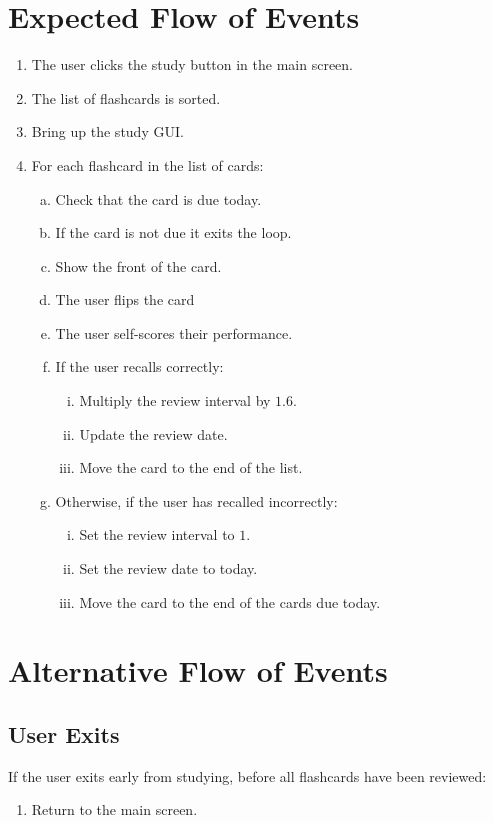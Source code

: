 \documentclass{scrreprt}
\begin{document}
\section{Expected Flow of Events}
\begin{enumerate}[1.]
    \item The user clicks the study button in the main screen.
    \item The list of flashcards is sorted.
    \item Bring up the study GUI.
    \item For each flashcard in the list of cards:
    \begin{enumerate}[a.]
        \item Check that the card is due today.
        \item If the card is not due it exits the loop.
        \item Show the front of the card.
        \item The user flips the card
        \item The user self-scores their performance.
        \item If the user recalls correctly:
        \begin{enumerate}[i)]
            \item Multiply the review interval by $1.6$.
            \item Update the review date.
            \item Move the card to the end of the list.
        \end{enumerate}
        \item Otherwise, if the user has recalled incorrectly:
        \begin{enumerate}[i)]
            \item Set the review interval to $1$.
            \item Set the review date to today.
            \item Move the card to the end of the cards due today.
        \end{enumerate}
    \end{enumerate}
\end{enumerate}

\section{Alternative Flow of Events}
    \subsection{User Exits}
    If the user exits early from studying, before all flashcards have been reviewed:
    \begin{enumerate}[1.]
        \item Return to the main screen.
    \end{enumerate}
\end{document}
